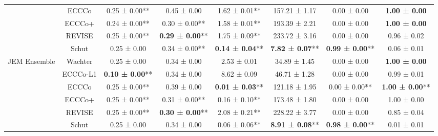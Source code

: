 \begin{table}
{\begin{tabular}[t]{cccccccc}
 & ECCCo & 0.25 ± 0.00** & 0.45 ± 0.00\hphantom{*}\hphantom{*} & 1.62 ± 0.01** & 157.21 ± 1.17\hphantom{*}\hphantom{*} & 0.00 ± 0.00\hphantom{*}\hphantom{*} & \textbf{1.00 ± 0.00}\hphantom{*}\hphantom{*}\\

 & ECCCo+ & 0.24 ± 0.00** & 0.30 ± 0.00** & 1.58 ± 0.01** & 193.39 ± 2.21\hphantom{*}\hphantom{*} & 0.00 ± 0.00\hphantom{*}\hphantom{*} & \textbf{1.00 ± 0.00}\hphantom{*}\hphantom{*}\\

 & REVISE & 0.25 ± 0.00** & \textbf{0.29 ± 0.00}** & 1.75 ± 0.09** & 233.72 ± 3.16\hphantom{*}\hphantom{*} & 0.00 ± 0.00\hphantom{*}\hphantom{*} & 0.96 ± 0.02\hphantom{*}\hphantom{*}\\

 & Schut & 0.25 ± 0.00\hphantom{*}\hphantom{*} & 0.34 ± 0.00** & \textbf{0.14 ± 0.04}** & \textbf{7.82 ± 0.07}** & \textbf{0.99 ± 0.00}** & 0.06 ± 0.01\hphantom{*}\hphantom{*}\\

\multirow[t]{-6}{*}{\centering\arraybackslash JEM Ensemble} & Wachter & 0.25 ± 0.00\hphantom{*}\hphantom{*} & 0.34 ± 0.00\hphantom{*}\hphantom{*} & 2.53 ± 0.01\hphantom{*}\hphantom{*} & 34.89 ± 1.45\hphantom{*}\hphantom{*} & 0.00 ± 0.00\hphantom{*}\hphantom{*} & \textbf{1.00 ± 0.00}\hphantom{*}\hphantom{*}\\
\cmidrule{1-8}
 & ECCCo-L1 & \textbf{0.10 ± 0.00}** & 0.34 ± 0.00\hphantom{*}\hphantom{*} & 8.62 ± 0.09\hphantom{*}\hphantom{*} & 46.71 ± 1.28\hphantom{*}\hphantom{*} & 0.00 ± 0.00\hphantom{*}\hphantom{*} & 0.99 ± 0.01\hphantom{*}\hphantom{*}\\

 & ECCCo & 0.25 ± 0.00** & 0.39 ± 0.00\hphantom{*}\hphantom{*} & \textbf{0.01 ± 0.03}** & 121.18 ± 1.95\hphantom{*}\hphantom{*} & 0.00 ± 0.00** & \textbf{1.00 ± 0.00}**\\

 & ECCCo+ & 0.25 ± 0.00** & 0.31 ± 0.00** & 0.16 ± 0.10** & 173.48 ± 1.80\hphantom{*}\hphantom{*} & 0.00 ± 0.00\hphantom{*}\hphantom{*} & 1.00 ± 0.00\hphantom{*}\hphantom{*}\\

 & REVISE & 0.25 ± 0.00** & \textbf{0.30 ± 0.00}** & 2.08 ± 0.21** & 228.22 ± 3.77\hphantom{*}\hphantom{*} & 0.00 ± 0.00\hphantom{*}\hphantom{*} & 0.85 ± 0.04\hphantom{*}\hphantom{*}\\

 & Schut & 0.25 ± 0.00\hphantom{*}\hphantom{*} & 0.34 ± 0.00\hphantom{*}\hphantom{*} & 0.06 ± 0.06** & \textbf{8.91 ± 0.08}** & \textbf{0.98 ± 0.00}** & 0.01 ± 0.01\hphantom{*}\hphantom{*}\\


\end{tabular}}
\end{table}
